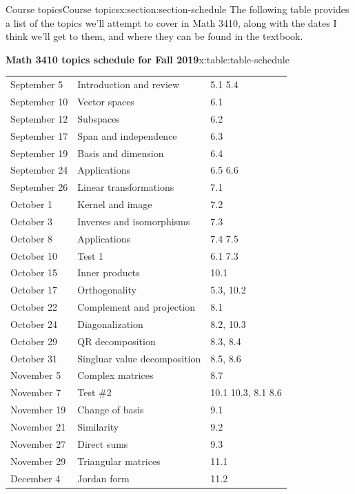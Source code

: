 \documentclass[oneside,10pt,]{article}
\begin{document}
\begin{sectionptx}{Course topics}{}{Course topics}{}{}{x:section:section-schedule}
The following table provides a list of the topics we'll attempt to cover in Math 3410, along with the dates I think we'll get to them, and where they can be found in the textbook.%
\begin{tableptx}{\textbf{Math 3410 topics schedule for Fall 2019}}{x:table:table-schedule}{}%
\centering
\begin{tabular}{lll}
September 5&Introduction and review&5.1  \textendash{}  5.4\tabularnewline[0pt]
September 10&Vector spaces&6.1\tabularnewline[0pt]
September 12&Subspaces&6.2\tabularnewline[0pt]
September 17&Span and independence&6.3\tabularnewline[0pt]
September 19&Basis and dimension&6.4\tabularnewline[0pt]
September 24&Applications&6.5 \textendash{} 6.6\tabularnewline[0pt]
September 26&Linear transformations&7.1\tabularnewline[0pt]
October 1&Kernel and image&7.2\tabularnewline[0pt]
October 3&Inverses and isomorphisms&7.3\tabularnewline[0pt]
October 8&Applications&7.4  \textendash{}  7.5\tabularnewline[0pt]
October 10&Test 1&6.1 \textendash{} 7.3\tabularnewline[0pt]
October 15&Inner products&10.1\tabularnewline[0pt]
October 17&Orthogonality&5.3, 10.2\tabularnewline[0pt]
October 22&Complement and projection&8.1\tabularnewline[0pt]
October 24&Diagonalization&8.2, 10.3\tabularnewline[0pt]
October 29&QR decomposition&8.3, 8.4\tabularnewline[0pt]
October 31&Singluar value decomposition&8.5, 8.6\tabularnewline[0pt]
November 5&Complex matrices&8.7\tabularnewline[0pt]
November 7&Test \#2&10.1 \textendash{} 10.3, 8.1 \textendash{} 8.6\tabularnewline[0pt]
November 19&Change of basis&9.1\tabularnewline[0pt]
November 21&Similarity&9.2\tabularnewline[0pt]
November 27&Direct sums&9.3\tabularnewline[0pt]
November 29&Triangular matrices&11.1\tabularnewline[0pt]
December 4&Jordan form&11.2
\end{tabular}
\end{tableptx}%
\end{sectionptx}
\end{document}
